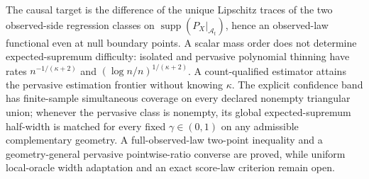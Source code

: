 The causal target is the difference of the unique Lipschitz traces of the two observed-side regression classes on \(\operatorname{supp}(P_X|_{\mathcal A_t})\), hence an observed-law functional even at null boundary points. A scalar mass order does not determine expected-supremum difficulty: isolated and pervasive polynomial thinning have rates \(n^{-1/(\kappa+2)}\) and \((\log n/n)^{1/(\kappa+2)}\). A count-qualified estimator attains the pervasive estimation frontier without knowing \(\kappa\). The explicit confidence band has finite-sample simultaneous coverage on every declared nonempty triangular union; whenever the pervasive class is nonempty, its global expected-supremum half-width is matched for every fixed \(\gamma\in(0,1)\) on any admissible complementary geometry. A full-observed-law two-point inequality and a geometry-general pervasive pointwise-ratio converse are proved, while uniform local-oracle width adaptation and an exact score-law criterion remain open.